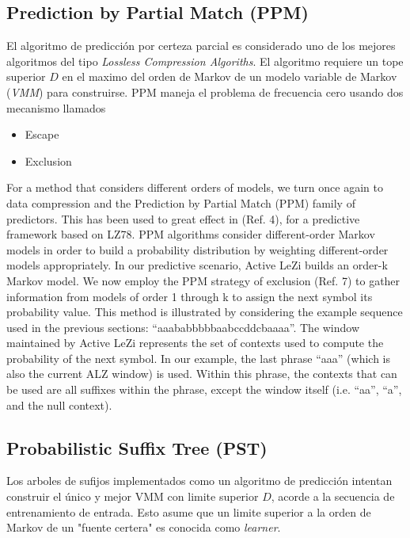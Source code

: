  
 \subsection{Prediction by Partial Match (PPM)}
 
	El algoritmo de predicción por certeza parcial es considerado uno de los mejores algoritmos del tipo \emph{Lossless Compression Algoriths}. El algoritmo requiere un tope superior $D$ en el maximo del orden de Markov de un modelo variable de Markov (\emph{VMM}) para construirse. 
	PPM maneja el problema de frecuencia cero usando dos mecanismo  llamados
	
	\begin{itemize}
		\item Escape
		\item Exclusion
	\end{itemize}
	
For a method that considers different orders of models, we turn once again to data compression and the Prediction by Partial Match (PPM) family of predictors. This has been used to great effect in (Ref. 4), for a predictive framework based on LZ78.
PPM algorithms consider different-order Markov models in order to build a probability distribution by weighting different-order models appropriately. In our predictive scenario, Active LeZi builds an order-k Markov model. We now employ the PPM strategy of exclusion (Ref. 7) to gather information from models of order 1 through k to assign the next symbol its probability value. This method is illustrated by considering the example sequence used in the previous sections: “aaababbbbbaabccddcbaaaa”.
The window maintained by Active LeZi represents the set of contexts used to compute the probability of the next symbol. In our example, the last phrase “aaa” (which is also the current ALZ window) is used. Within this phrase, the contexts that can be used are all suffixes within the phrase, except the window itself (i.e. “aa”, “a”, and the null context).	
	
	


 \subsection{Probabilistic Suffix Tree (PST)}
 
 Los arboles de sufijos implementados como un algoritmo de predicción intentan construir el único y mejor VMM con limite superior $D$, acorde a la secuencia de entrenamiento de entrada. Esto asume que un limite superior a la orden de Markov de un "fuente certera" es conocida como \emph{learner}.
 
